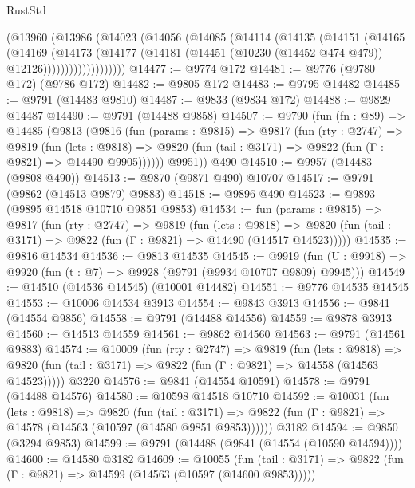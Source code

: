 \begin{lexlean}{RustStd}
\begin{coremodule}
              (@13960
                (@13986
                  (@14023
                    (@14056
                      (@14085
                        (@14114
                          (@14135
                            (@14151
                              (@14165
                                (@14169
                                  (@14173
                                    (@14177
                                      (@14181
                                        (@14451
                                          (@10230 (@14452 @474 @479))
                                          @12126)))))))))))))))))))
@14477 := @9774 @172
@14481 := @9776 (@9780 @172) (@9786 @172)
@14482 := @9805 @172
@14483 := @9795 @14482
@14485 := @9791 (@14483 @9810)
@14487 := @9833 (@9834 @172)
@14488 := @9829 @14487
@14490 := @9791 (@14488 @9858)
@14507 := @9790
    (fun (fn : @89) =>
    @14485
      (@9813
        (@9816
          (fun (params : @9815) =>
          @9817
            (fun (rty : @2747) =>
            @9819
              (fun (lets : @9818) =>
              @9820 (fun (tail : @3171) => @9822 (fun (Γ : @9821) => @14490 @9905))))))
        @9951))
    @490
@14510 := @9957 (@14483 (@9808 @490))
@14513 := @9870 (@9871 @490) @10707
@14517 := @9791 (@9862 (@14513 @9879) @9883)
@14518 := @9896 @490
@14523 := @9893 (@9895 @14518 @10710 @9851 @9853)
@14534 := fun (params : @9815) =>
  @9817
    (fun (rty : @2747) =>
    @9819
      (fun (lets : @9818) =>
      @9820 (fun (tail : @3171) => @9822 (fun (Γ : @9821) => @14490 (@14517 @14523)))))
@14535 := @9816 @14534
@14536 := @9813 @14535
@14545 := @9919
    (fun (U : @9918) => @9920 (fun (t : @7) => @9928 (@9791 (@9934 @10707 @9809) @9945)))
@14549 := @14510 (@14536 @14545) (@10001 @14482)
@14551 := @9776 @14535 @14545
@14553 := @10006 @14534 @3913
@14554 := @9843 @3913
@14556 := @9841 (@14554 @9856)
@14558 := @9791 (@14488 @14556)
@14559 := @9878 @3913
@14560 := @14513 @14559
@14561 := @9862 @14560
@14563 := @9791 (@14561 @9883)
@14574 := @10009
    (fun (rty : @2747) =>
    @9819
      (fun (lets : @9818) =>
      @9820 (fun (tail : @3171) => @9822 (fun (Γ : @9821) => @14558 (@14563 @14523)))))
    @3220
@14576 := @9841 (@14554 @10591)
@14578 := @9791 (@14488 @14576)
@14580 := @10598 @14518 @10710
@14592 := @10031
    (fun (lets : @9818) =>
    @9820
      (fun (tail : @3171) =>
      @9822 (fun (Γ : @9821) => @14578 (@14563 (@10597 (@14580 @9851 @9853))))))
    @3182
@14594 := @9850 (@3294 @9853)
@14599 := @9791 (@14488 (@9841 (@14554 (@10590 @14594))))
@14600 := @14580 @3182
@14609 := @10055
    (fun (tail : @3171) => @9822 (fun (Γ : @9821) => @14599 (@14563 (@10597 (@14600 @9853)))))

\end{coremodule}
\end{lexlean}

